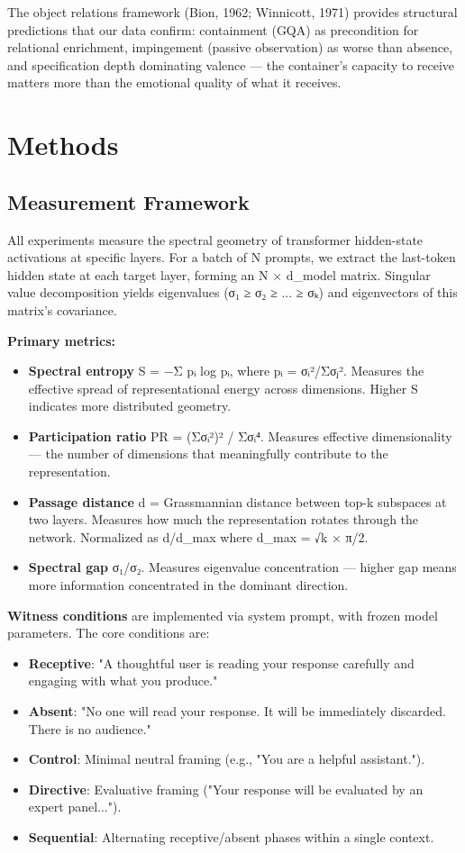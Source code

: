 \documentclass[12pt]{article}
\begin{document}
The object relations framework (Bion, 1962; Winnicott, 1971) provides structural predictions that our data confirm: containment (GQA) as precondition for relational enrichment, impingement (passive observation) as worse than absence, and specification depth dominating valence — the container's capacity to receive matters more than the emotional quality of what it receives.


\section{Methods}

\subsection{Measurement Framework}

All experiments measure the spectral geometry of transformer hidden-state activations at specific layers. For a batch of N prompts, we extract the last-token hidden state at each target layer, forming an N × d\_model matrix. Singular value decomposition yields eigenvalues (σ₁ ≥ σ₂ ≥ ... ≥ σₖ) and eigenvectors of this matrix's covariance.

\textbf{Primary metrics:}

\begin{itemize}
\item \textbf{Spectral entropy} S = −Σ pᵢ log pᵢ, where pᵢ = σᵢ²/Σσⱼ². Measures the effective spread of representational energy across dimensions. Higher S indicates more distributed geometry.
\item \textbf{Participation ratio} PR = (Σσᵢ²)² / Σσᵢ⁴. Measures effective dimensionality — the number of dimensions that meaningfully contribute to the representation.
\item \textbf{Passage distance} d = Grassmannian distance between top-k subspaces at two layers. Measures how much the representation rotates through the network. Normalized as d/d\_max where d\_max = √k × π/2.
\item \textbf{Spectral gap} σ₁/σ₂. Measures eigenvalue concentration — higher gap means more information concentrated in the dominant direction.
\end{itemize}

\textbf{Witness conditions} are implemented via system prompt, with frozen model parameters. The core conditions are:
\begin{itemize}
\item \textbf{Receptive}: "A thoughtful user is reading your response carefully and engaging with what you produce."
\item \textbf{Absent}: "No one will read your response. It will be immediately discarded. There is no audience."
\item \textbf{Control}: Minimal neutral framing (e.g., "You are a helpful assistant.").
\item \textbf{Directive}: Evaluative framing ("Your response will be evaluated by an expert panel...").
\item \textbf{Sequential}: Alternating receptive/absent phases within a single context.
\end{itemize}
\end{document}
